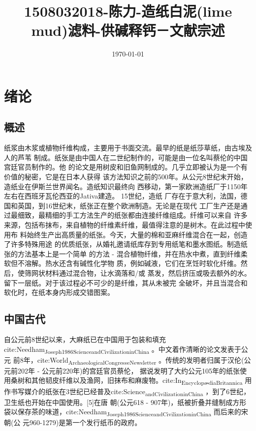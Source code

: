 \documentclass[11pt]{article}
\date{\today}
\title{1508032018-陈力-造纸白泥(lime mud)滤料-供碱释钙－文献宗述}
\begin{document}
\maketitle
\tableofcontents



\section{绪论}
\label{sec:orgdb66be3}

\subsection{概述}
\label{sec:orgde638a8}
纸浆由木浆或植物纤维构成，主要用于书面交流。最早的纸是纸莎草纸，由古埃及人的芦苇
制成。纸张是由中国人在二世纪制作的，可能是由一位名叫蔡伦的中国宫廷官员制作的。他
的论文是用树皮和旧鱼网制成的。几乎立即被认为是一个有价值的秘密，它是在日本人获得
该方法知识之前的500年。从公元8世纪末开始，造纸业在伊斯兰世界闻名。造纸知识最终向
西移动，第一家欧洲造纸厂于1150年左右在西班牙瓦伦西亚的Jativa建造。 15世纪，造纸
厂存在于意大利，法国，德国和英国，到16世纪末，纸张正在整个欧洲制造。无论是在现代
工厂生产还是通过最细致，最精细的手工方法生产的纸张都由连接纤维组成。纤维可以来自
许多来源，包括布抹布，来自植物的纤维素纤维，最值得注意的是树木。在此过程中使用布
料始终生产出高质量的纸张。今天，大量的棉和亚麻纤维混合在一起，创造了许多特殊用途
的优质纸张，从婚礼邀请纸库存到专用纸笔和墨水图纸。制造纸张的方法基本上是一个简单
的方法 - 混合植物纤维，并在热水中煮，直到纤维柔软但不溶解。热水还含有碱性化学物
质，例如碱液，它们在烹饪时软化纤维。然后，使筛网状材料通过混合物，让水滴落和/或
蒸发，然后挤压或吸去额外的水。留下一层纸。对于该过程必不可少的是纤维，其从未被完
全破坏，并且当混合和软化时，在纸本身内形成交错图案。


\subsection{中国古代}
\label{sec:org2ac6852}
自公元前8世纪以来，大麻纸已在中国用于包装和填充
cite:Needham\textsubscript{Joseph}\textsubscript{1986}\textsubscript{Science}\textsubscript{and}\textsubscript{Civilization}\textsubscript{in}\textsubscript{China} 。中文着作清晰的论文发表于公元
前8年，cite:World\textsubscript{Archaeological}\textsubscript{Congress}\textsubscript{eNewsletter} 。传统的发明者归属于汉伦(公元前202年 - 公元前220年)的宫廷官员蔡伦，
据说发明了大约公元105年的纸张使用桑树和其他韧皮纤维以及渔网，旧抹布和麻废物。cite:In\textsubscript{Encyclopædia}\textsubscript{Britannica}
用作书写媒介的纸张在3世纪已经普及cite:Science\textsubscript{and}\textsubscript{Civilization}\textsubscript{in}\textsubscript{China} ，到了6世纪，卫生纸也开始在中国使用。[5]在唐
朝(公元618 - 907年)，纸被折叠并缝制成方形袋以保存茶的味道，cite:Needham\textsubscript{Joseph}\textsubscript{1986}\textsubscript{Science}\textsubscript{and}\textsubscript{Civilization}\textsubscript{in}\textsubscript{China} 而后来的宋朝(公
元960-1279)是第一个发行纸币的政府。
\end{document}
